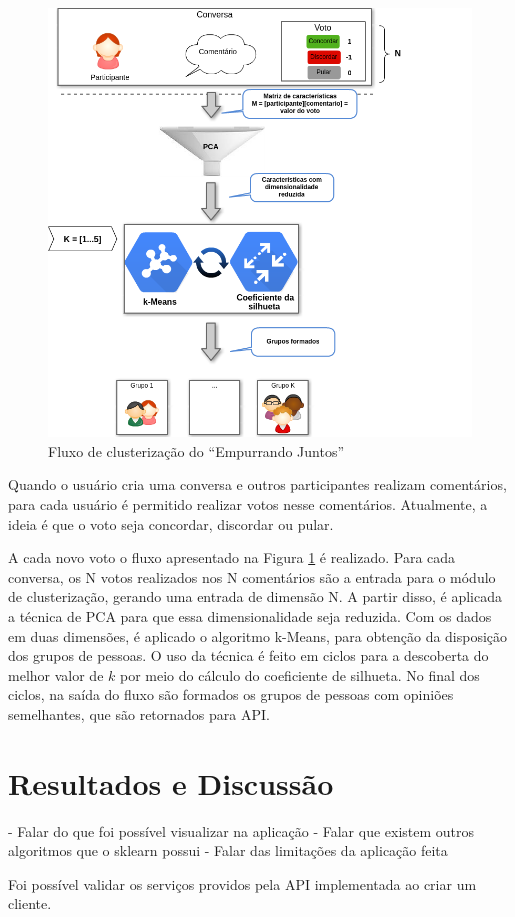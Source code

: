     \begin{figure}[h!]
      \centering
      \includegraphics[scale=0.7]{figuras/resumo_clusterizao_ej.png}
      \caption{Fluxo de clusterização do ``Empurrando Juntos''}
      \label{fig:resumo_clusterizao_ej}
    \end{figure}

    Quando o usuário cria uma conversa e outros participantes realizam comentários, para cada usuário é permitido realizar votos nesse comentários.
    Atualmente, a ideia é que o voto seja concordar, discordar ou pular. 

    A cada novo voto o fluxo apresentado na Figura \ref{fig:resumo_clusterizao_ej} é
    realizado.
    Para cada conversa, os N votos realizados nos N comentários são a entrada para o módulo de clusterização, 
    gerando uma entrada de dimensão N. A partir disso, é aplicada a técnica de PCA para que
    essa dimensionalidade seja reduzida. Com os dados em duas dimensões, é aplicado o algoritmo k-Means,
    para obtenção da disposição dos grupos de pessoas. O uso da técnica é
    feito em ciclos para a descoberta do melhor valor de $k$ por meio do cálculo do coeficiente de silhueta.
    No final dos ciclos, na saída do fluxo são formados os grupos de pessoas com opiniões semelhantes, que são retornados para API.

  \section{Resultados e Discussão}
  
    - Falar do que foi possível visualizar na aplicação
    - Falar que existem outros algoritmos que o sklearn possui
    - Falar das limitações da aplicação feita
    
    Foi possível validar os serviços providos pela API implementada ao criar um cliente.